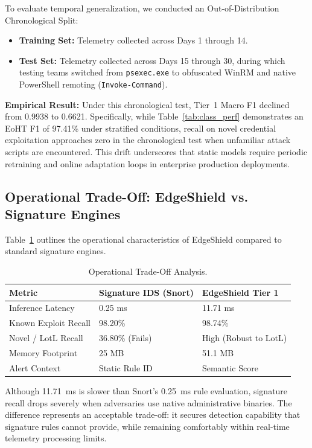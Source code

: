 \documentclass[10pt,journal,compsoc]{IEEEtran}
\begin{document}
To evaluate temporal generalization, we conducted an Out-of-Distribution Chronological Split:
\begin{itemize}
    \item \textbf{Training Set:} Telemetry collected across Days 1 through 14.
    \item \textbf{Test Set:} Telemetry collected across Days 15 through 30, during which testing teams switched from \texttt{psexec.exe} to obfuscated WinRM and native PowerShell remoting (\texttt{Invoke-Command}).
\end{itemize}

\textbf{Empirical Result:} Under this chronological test, Tier~1 Macro F1 declined from 0.9938 to 0.6621. Specifically, while Table~\ref{tab:class_perf} demonstrates an EoHT F1 of 97.41\% under stratified conditions, recall on novel credential exploitation approaches zero in the chronological test when unfamiliar attack scripts are encountered. This drift underscores that static models require periodic retraining and online adaptation loops in enterprise production deployments.

\subsection{Operational Trade-Off: EdgeShield vs. Signature Engines}
Table~\ref{tab:tradeoff} outlines the operational characteristics of EdgeShield compared to standard signature engines.

\begin{table}[htbp]
\centering
\caption{Operational Trade-Off Analysis.}
\label{tab:tradeoff}
\begin{tabular}{lll}
\toprule
\textbf{Metric} & \textbf{Signature IDS (Snort)} & \textbf{EdgeShield Tier 1} \\
\midrule
Inference Latency & 0.25 ms & 11.71 ms \\
Known Exploit Recall & 98.20\% & 98.74\% \\
Novel / LotL Recall & 36.80\% (Fails) & High (Robust to LotL) \\
Memory Footprint & 25 MB & 51.1 MB \\
Alert Context & Static Rule ID & Semantic Score \\
\bottomrule
\end{tabular}
\end{table}

Although 11.71~ms is slower than Snort's 0.25~ms rule evaluation, signature recall drops severely when adversaries use native administrative binaries. The difference represents an acceptable trade-off: it secures detection capability that signature rules cannot provide, while remaining comfortably within real-time telemetry processing limits.
\end{document}
